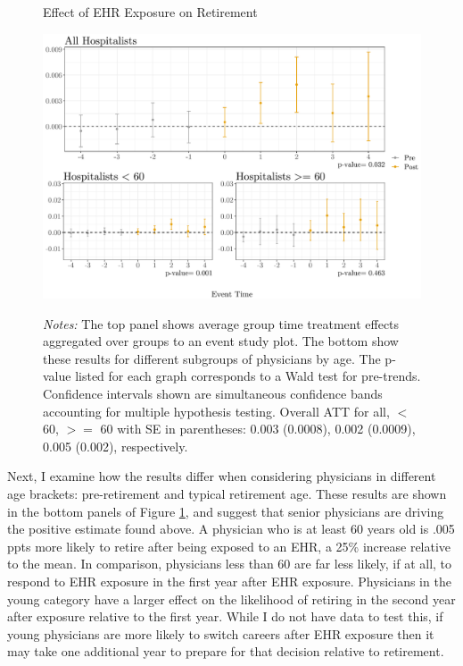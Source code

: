 \documentclass[11pt]{article}
\begin{document}
\begin{figure}[ht]
    \centering
    \captionsetup{width=.85\linewidth}
    \caption{Effect of EHR Exposure on Retirement}
    \includegraphics[scale=.65]{Objects/retire_plot.pdf}
    \label{fig:retirefirst}
    \vspace{2mm}
    \caption*{\footnotesize{\textit{Notes:} The top panel shows average group time treatment effects aggregated over groups to an event study plot. The bottom show these results for different subgroups of physicians by age. The p-value listed for each graph corresponds to a Wald test for pre-trends. Confidence intervals shown are simultaneous confidence bands accounting for multiple hypothesis testing. Overall ATT for all, $<$ 60, $>=$ 60 with SE in parentheses: 0.003 (0.0008), 0.002 (0.0009), 0.005 (0.002), respectively.}}
\end{figure}


Next, I examine how the results differ when considering physicians in different age brackets: pre-retirement and typical retirement age. These results are shown in the bottom panels of Figure \ref{fig:retirefirst}, and suggest that senior physicians are driving the positive estimate found above. A physician who is at least 60 years old is .005 ppts more likely to retire after being exposed to an EHR, a 25\% increase relative to the mean. In comparison, physicians less than 60 are far less likely, if at all, to respond to EHR exposure in the first year after EHR exposure. Physicians in the young category have a larger effect on the likelihood of retiring in the second year after exposure relative to the first year. While I do not have data to test this, if young physicians are more likely to switch careers after EHR exposure then it may take one additional year to prepare for that decision relative to retirement.   
\end{document}

